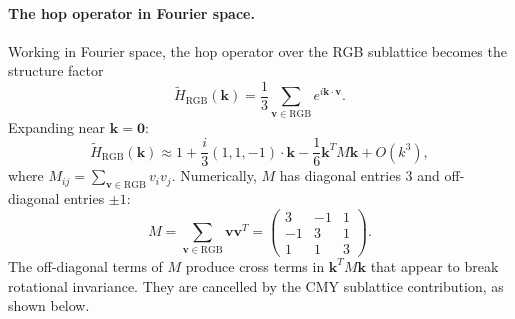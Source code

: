 \paragraph{The hop operator in Fourier space.}
Working in Fourier space, the hop operator over the RGB sublattice becomes
the structure factor
\begin{equation}
    \tilde{H}_\text{RGB}(\mathbf{k})
        = \frac{1}{3}\sum_{\mathbf{v}\in\text{RGB}} e^{i\mathbf{k}\cdot\mathbf{v}}.
    \label{eq:structure_factor}
\end{equation}
Expanding near $\mathbf{k} = \mathbf{0}$:
\begin{equation}
    \tilde{H}_\text{RGB}(\mathbf{k})
        \approx 1
          + \frac{i}{3}(1,1,-1)\cdot\mathbf{k}
          - \frac{1}{6}\mathbf{k}^T M \mathbf{k}
          + O(k^3),
    \label{eq:hop_expand}
\end{equation}
where $M_{ij} = \sum_{\mathbf{v}\in\text{RGB}} v_i v_j$.
Numerically, $M$ has diagonal entries $3$ and off-diagonal entries $\pm 1$:
\begin{equation}
    M = \sum_{\mathbf{v}\in\text{RGB}} \mathbf{v}\mathbf{v}^T
      = \begin{pmatrix} 3 & -1 & 1 \\ -1 & 3 & 1 \\ 1 & 1 & 3 \end{pmatrix}.
    \label{eq:frame_matrix}
\end{equation}
The off-diagonal terms of $M$ produce cross terms in $\mathbf{k}^T M \mathbf{k}$
that appear to break rotational invariance.
They are cancelled by the CMY sublattice contribution, as shown below.

